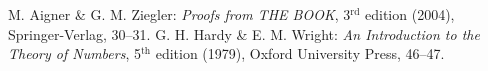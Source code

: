 \documentclass[12pt]{article}
\begin{document}
\begin{thebibliography}{2}
 {\sc M. Aigner \& G. M. Ziegler}: \emph{Proofs from THE BOOK}, 3\(^\mathrm{rd}\) edition (2004), Springer-Verlag, 30--31.
 {\sc G. H. Hardy \& E. M. Wright}: \emph{An Introduction to the Theory of Numbers}, 5\(^\mathrm{th}\) edition (1979), Oxford University Press, 46--47.
\end{thebibliography}
\end{document}
